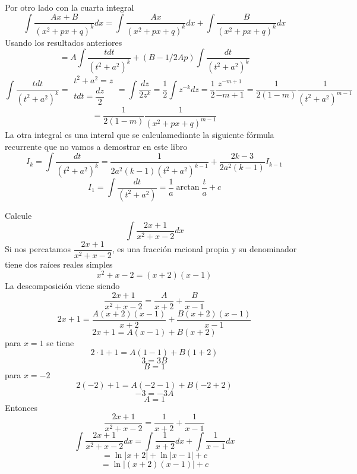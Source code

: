 \documentclass[10pt,twoside]{SelfArx} %
\begin{document}
Por otro lado con la cuarta integral
\begin{equation}
\displaystyle\int\dfrac{Ax+B}{(x^{2}+px+q)^{k}}dx=\int\dfrac{Ax}{(x^{2}+px+q)^{k}}dx+\int\dfrac{B}{(x^{2}+px+q)^{k}}dx
\end{equation}
Usando los resultados anteriores
\begin{equation}
= A\int\dfrac{tdt}{(t^{2}+a^{2})^{k}}+ (B-1/2Ap)\int\dfrac{dt}{(t^{2}+a^{2})^{k}}
\end{equation}
\[ 
\int\dfrac{tdt}{(t^{2}+a^{2})^{k}}=\begin{array}{c}
t^{2}+a^{2}=z\\ tdt=\dfrac{dz}{2}
\end{array}=\int\dfrac{dz}{2z^{k}}=\dfrac{1}{2}\int z^{-k}dz=\dfrac{1}{2}\dfrac{z^{-m+1}}{-m+1}=\dfrac{1}{2(1-m)}\dfrac{1}{(t^{2}+a^{2})^{m-1}}
 \]
\[ =\dfrac{1}{2(1-m)}\dfrac{1}{(x^{2}+px+q)^{m-1}} \]
La otra integral es una interal que se calculamediante la siguiente fórmula recurrente que no vamos a demostrar en este libro
\[ I_{k}=\int\dfrac{dt}{(t^{2}+a^{2})^{k}}=\dfrac{1}{2a^{2}(k-1)(t^{2}+a^{2})^{k-1}}+\dfrac{2k-3}{2a^{2}(k-1)}I_{k-1}
\]
\[ 
I_{1}=\int\frac{dt}{(t^{2}+a^{2})}=\dfrac{1}{a}\arctan\dfrac{t}{a}+c
\]
\begin{ejemplo}
	Calcule
	\begin{equation}
	\int\dfrac{2x+1}{x^{2}+x-2}dx
	\end{equation}
	Si nos percatamos $ \dfrac{2x+1}{x^{2}+x-2} $, es una fracción racional propia y su denominador tiene dos raíces reales simples
	\[ x^{2}+x-2=(x+2)(x-1) \]
	La descomposición viene siendo
	\[ \dfrac{2x+1}{x^{2}+x-2}=\dfrac{A}{x+2}+\dfrac{B}{x-1} \]
	\[ 2x+1=\dfrac{A(x+2)(x-1)}{x+2}+\dfrac{B(x+2)(x-1)}{x-1} \]
	\[ 2x+1=A(x-1)+B(x+2) \]
	para $ x=1 $ se tiene
	\[ 2\cdot1+1=A(1-1)+B(1+2) \]
	\[ 3=3B \]
	\[ B=1 \]
	para $ x=-2 $
	\[ 2(-2)+1=A(-2-1)+B(-2+2) \]
	\[ -3=-3A \]
	\[ A=1 \]
	Entonces
	\[ \dfrac{2x+1}{x^{2}+x-2}=\dfrac{1}{x+2}+\dfrac{1}{x-1} \]
	\[ \int \dfrac{2x+1}{x^{2}+x-2}dx=\int\dfrac{1}{x+2}dx+\int\dfrac{1}{x-1}dx \]
	\[ =\ln |x+2|+\ln|x-1|+c \]
	\[ =\ln|(x+2)(x-1)|+c \]
\end{ejemplo}











 
\end{document}
